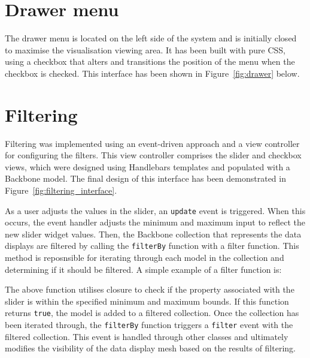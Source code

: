 \section{Drawer menu} {
\label{sec:drawer}

	The drawer menu is located on the left side of the system and is initially closed to maximise the visualisation viewing area. It has been built with pure CSS, using a checkbox that alters and transitions the position of the menu when the checkbox is checked. This interface has been shown in Figure~\ref{fig:drawer} below.

	

}

\section{Filtering} {
\label{sec:filtering_implementation}

	

	Filtering was implemented using an event-driven approach and a view controller for configuring the filters. This view controller comprises the slider and checkbox views, which were designed using Handlebars templates and populated with a Backbone model. The final design of this interface has been demonstrated in Figure~\ref{fig:filtering_interface}.

	As a user adjusts the values in the slider, an \texttt{update} event is triggered. When this occurs, the event handler adjusts the minimum and maximum input to reflect the new slider widget values. Then, the Backbone collection that represents the data displays are filtered by calling the \texttt{filterBy} function with a filter function. This method is reposnsible for iterating through each model in the collection and determining if it should be filtered. A simple example of a filter function is:

	

	The above function utilises closure to check if the property associated with the slider is within the specified minimum and maximum bounds. If this function returns \texttt{true}, the model is added to a filtered collection. Once the collection has been iterated through, the \texttt{filterBy} function triggers a \texttt{filter} event with the filtered collection. This event is handled through other classes and ultimately modifies the visibility of the data display mesh based on the results of filtering.

}
